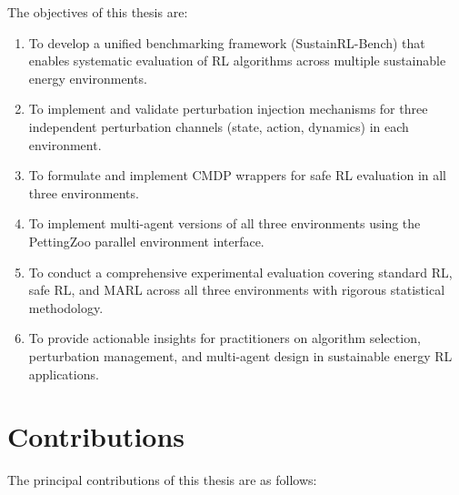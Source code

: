 The objectives of this thesis are:

\begin{enumerate}
    \item To develop a unified benchmarking framework (SustainRL-Bench) that enables systematic evaluation of RL algorithms across multiple sustainable energy environments.

    \item To implement and validate perturbation injection mechanisms for three independent perturbation channels (state, action, dynamics) in each environment.

    \item To formulate and implement CMDP wrappers for safe RL evaluation in all three environments.

    \item To implement multi-agent versions of all three environments using the PettingZoo parallel environment interface.

    \item To conduct a comprehensive experimental evaluation covering standard RL, safe RL, and MARL across all three environments with rigorous statistical methodology.

    \item To provide actionable insights for practitioners on algorithm selection, perturbation management, and multi-agent design in sustainable energy RL applications.
\end{enumerate}

\section{Contributions}
\label{sec:contributions}

The principal contributions of this thesis are as follows:

